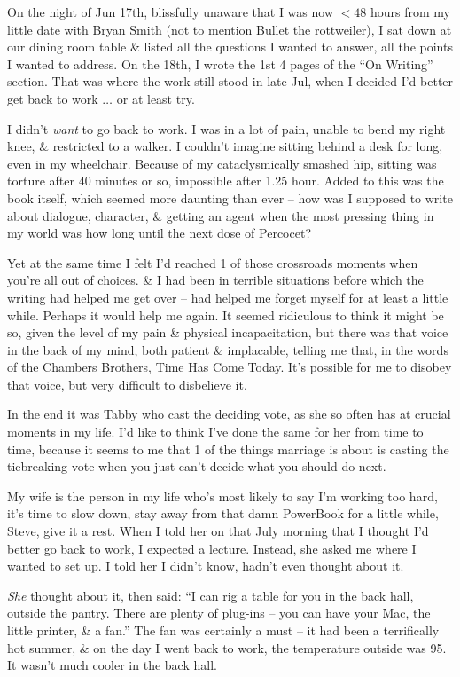 \documentclass{article}
\numberwithin{equation}{section}
\begin{document}
On the night of Jun 17th, blissfully unaware that I was now $< 48$ hours from my little date with Bryan Smith (not to mention Bullet the rottweiler), I sat down at our dining room table \& listed all the questions I wanted to answer, all the points I wanted to address. On the 18th, I wrote the 1st 4 pages of the ``On Writing'' section. That was where the work still stood in late Jul, when I decided I'd better get back to work $\ldots$ or at least try.

I didn't \textit{want} to go back to work. I was in a lot of pain, unable to bend my right knee, \& restricted to a walker. I couldn't imagine sitting behind a desk for long, even in my wheelchair. Because of my cataclysmically smashed hip, sitting was torture after 40 minutes or so, impossible after 1.25 hour. Added to this was the book itself, which seemed more daunting than ever -- how was I supposed to write about dialogue, character, \& getting an agent when the most pressing thing in my world was how long until the next dose of Percocet?

Yet at the same time I felt I'd reached 1 of those crossroads moments when you're all out of choices. \& I had been in terrible situations before which the writing had helped me get over -- had helped me forget myself for at least a little while. Perhaps it would help me again. It seemed ridiculous to think it might be so, given the level of my pain \& physical incapacitation, but there was that voice in the back of my mind, both patient \& implacable, telling me that, in the words of the Chambers Brothers, Time Has Come Today. It's possible for me to disobey that voice, but very difficult to disbelieve it.

In the end it was Tabby who cast the deciding vote, as she so often has at crucial moments in my life. I'd like to think I've done the same for her from time to time, because it seems to me that 1 of the things marriage is about is casting the tiebreaking vote when you just can't decide what you should do next.

My wife is the person in my life who's most likely to say I'm working too hard, it's time to slow down, stay away from that damn PowerBook for a little while, Steve, give it a rest. When I told her on that July morning that I thought I'd better go back to work, I expected a lecture. Instead, she asked me where I wanted to set up. I told her I didn't know, hadn't even thought about it.

\textit{She} thought about it, then said: ``I can rig a table for you in the back hall, outside the pantry. There are plenty of plug-ins -- you can have your Mac, the little printer, \& a fan.'' The fan was certainly a must -- it had been a terrifically hot summer, \& on the day I went back to work, the temperature outside was 95. It wasn't much cooler in the back hall.
\end{document}
